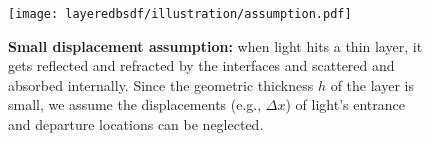 \begin{figure}[!ht]
	\centering
	\texttt{[image: layeredbsdf/illustration/assumption.pdf]}
	\caption[Small displacement assumption]{\label{fig:layeredbsdf:assumption}
		\textbf{Small displacement assumption:}
		when light hits a thin layer, it gets reflected and refracted by the interfaces and scattered and absorbed internally.
		Since the geometric thickness $h$ of the layer is small, we assume the displacements (e.g., $\Delta x$) of light's entrance and departure locations can be neglected.
	}
\end{figure}